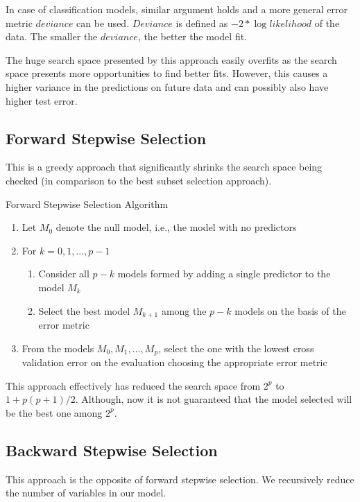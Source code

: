 \documentclass[../statistical_learning_notes.tex]{subfiles}
\begin{document}
    In case of classification models, similar argument holds and a more general error metric $deviance$ can be used. $Deviance$ is defined as $-2 * \log likelihood$ of the data. The smaller the $deviance$, the better the model fit.\newline

    The huge search space presented by this approach easily overfits as the search space presents more opportunities to find better fits. However, this causes a higher variance in the predictions on future data and can possibly also have higher test error.

    
    \subsection{Forward Stepwise Selection}
    This is a greedy approach that significantly shrinks the search space being checked (in comparison to the best subset selection approach).

    Forward Stepwise Selection Algorithm
    \begin{enumerate}
        \item Let $M_{0}$ denote the null model, i.e., the model with no predictors
        \item For $k = 0, 1, \ldots, p - 1$
        \begin{enumerate}
            \item Consider all $p - k$ models formed by adding a single predictor to the model $M_{k}$
            \item Select the best model $M_{k+1}$ among the $p - k$ models on the basis of the error metric
        \end{enumerate}
        \item From the models $M_{0}, M_{1}, \ldots, M_{p}$, select the one with the lowest cross validation error on the evaluation choosing the appropriate error metric
    \end{enumerate}

    This approach effectively has reduced the search space from $2^{p}$ to $1 + p(p+1)/2$. Although, now it is not guaranteed that the model selected will be the best one among $2^{p}$.


    \subsection{Backward Stepwise Selection}
    This approach is the opposite of forward stepwise selection. We recursively reduce the number of variables in our model.
\end{document}
